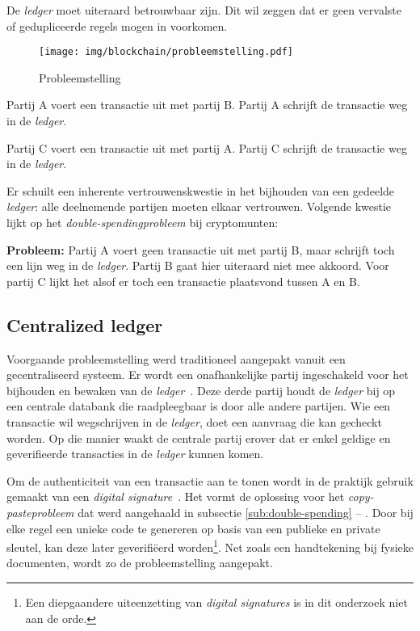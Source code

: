 De \textit{ledger} moet uiteraard betrouwbaar zijn. Dit wil zeggen dat er geen vervalste of gedupliceerde regels mogen in voorkomen.

\begin{figure}[H]
	\centering
	\texttt{[image: img/blockchain/probleemstelling.pdf]}
	\caption{\label{fig:probleemstelling}Probleemstelling}
\end{figure}

\begin{tcolorbox}[title=Voorbeeld]	
Partij A voert een transactie uit met partij B. Partij A schrijft de transactie weg in de \textit{ledger}.

Partij C voert een transactie uit met partij A. Partij C schrijft de transactie weg in de \textit{ledger}.
\end{tcolorbox}

Er schuilt een inherente vertrouwenskwestie in het bijhouden van een gedeelde \textit{ledger}: alle deelnemende partijen moeten elkaar vertrouwen. Volgende kwestie lijkt op het \textit{double-spendingprobleem} bij cryptomunten:

\textbf{Probleem:} 
Partij A voert geen transactie uit met partij B, maar schrijft toch een lijn weg in de \textit{ledger}. Partij B gaat hier uiteraard niet mee akkoord. Voor partij C lijkt het alsof er toch een transactie plaatsvond tussen A en B.


\subsection{Centralized ledger}
\label{sub:centralized-ledger}

Voorgaande probleemstelling werd traditioneel aangepakt vanuit een gecentraliseerd systeem. Er wordt een onafhankelijke partij ingeschakeld voor het bijhouden en bewaken van de \textit{ledger}~\autocite{Rawat2020}. Deze derde partij houdt de \textit{ledger} bij op een centrale databank die raadpleegbaar is door alle andere partijen. Wie een transactie wil wegschrijven in de \textit{ledger}, doet een aanvraag die kan gecheckt worden. Op die manier waakt de centrale partij erover dat er enkel geldige en geverifieerde transacties in de \textit{ledger} kunnen komen. 

Om de authenticiteit van een transactie aan te tonen wordt in de praktijk gebruik gemaakt van een \textit{digital signature}~\autocite{Salem2008}. Het vormt de oplossing voor het \textit{copy-pasteprobleem} dat werd aangehaald in subsectie \ref{sub:double-spending} -- . Door bij elke regel een unieke code te genereren op basis van een publieke en private sleutel, kan deze later geverifiëerd worden\footnote{Een diepgaandere uiteenzetting van \textit{digital signatures} is in dit onderzoek niet aan de orde.}. Net zoals een handtekening bij fysieke documenten, wordt zo de probleemstelling aangepakt.

